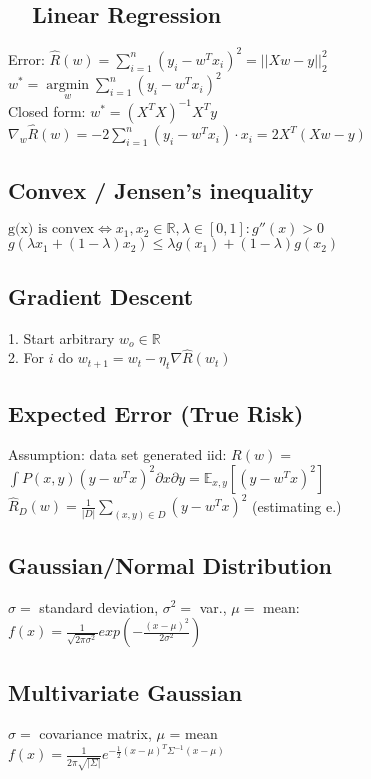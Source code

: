 \subsection*{ ~~Linear Regression}
Error: $\hat{R}(w) = \sum_{i=1}^n (y_i - w^Tx_i)^2 = ||Xw-y||^2_2$\\
$w^* = \underset{w}{\operatorname{argmin}} \sum_{i=1}^n (y_i - w^Tx_i)^2$\\
Closed form: $w^*=(X^T X)^{-1} X^T y$\\
$\nabla_w \hat{R}(w) = -2 \sum_{i=1}^n (y_i-w^T x_i) \cdot x_i = 2X^T (Xw-y)$

\subsection*{Convex / Jensen's inequality}
$\text{g(x) is convex} \Leftrightarrow x_1,x_2 \in \mathbb{R}, \lambda \in [0,1]: g''(x) > 0$\\
$g(\lambda x_1 + (1-\lambda) x_2) \leq \lambda g(x_1) + (1-\lambda) g(x_2)$

\subsection*{Gradient Descent}
1. Start arbitrary $w_o \in \mathbb{R}$\\
2. For $i$ do $w_{t+1} = w_t - \eta_t \nabla \hat{R}(w_t)$

\subsection*{Expected Error (True Risk)}
Assumption: data set generated iid: $R(w) =$\\ 
$\int P(x,y) (y-w^Tx)^2 \partial x \partial y = \mathbb{E}_{x,y}[(y-w^Tx)^2]$\\
$\hat{R}_D(w) = \frac{1}{|D|}\sum_{(x,y)\in D} (y-w^Tx)^2$ (estimating e.) %

\subsection*{Gaussian/Normal Distribution}
$\sigma =$ standard deviation, $\sigma^2 =$ var., $\mu =$ mean:\\
$f(x) = \frac{1}{\sqrt{2\pi\sigma^2}} exp(-\frac{(x-\mu)^2}{2\sigma^2})$

\subsection*{Multivariate Gaussian}
$\sigma =$ covariance matrix, $\mu$ = mean\\
$f(x) = \frac{1}{2\pi \sqrt{|\Sigma|}} e^{- \frac{1}{2} (x-\mu)^T \Sigma^{-1} (x-\mu)}$


